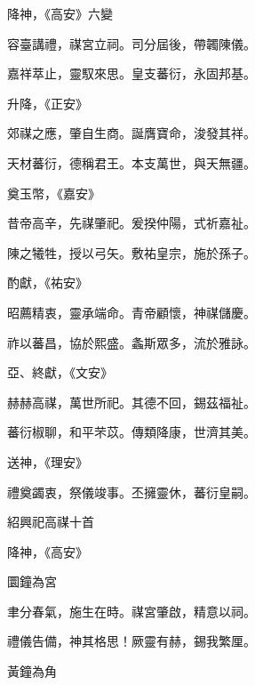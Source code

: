 \begin{pinyinscope}
 降神，《高安》六變



 容臺講禮，禖宮立祠。司分屆後，帶韣陳儀。



 嘉祥萃止，靈馭來思。皇支蕃衍，永固邦基。



 升降，《正安》



 郊禖之應，肇自生商。誕膺寶命，浚發其祥。



 天材蕃衍，德稱君王。本支萬世，與天無疆。



 奠玉幣，《嘉安》



 昔帝高辛，先禖肇祀。爰揆仲陽，式祈嘉祉。



 陳之犧牲，授以弓矢。敷祐皇宗，施於孫子。



 酌獻，《祐安》



 昭薦精衷，靈承端命。青帝顧懷，神禖儲慶。



 祚以蕃昌，協於熙盛。螽斯眾多，流於雅詠。



 亞、終獻，《文安》



 赫赫高禖，萬世所祀。其德不回，錫茲福祉。



 蕃衍椒聊，和平芣苡。傳類降康，世濟其美。



 送神，《理安》



 禮奠蠲衷，祭儀竣事。丕擁靈休，蕃衍皇嗣。



 紹興祀高禖十首



 降神，《高安》



 圜鐘為宮



 聿分春氣，施生在時。禖宮肇啟，精意以祠。



 禮儀告備，神其格思！厥靈有赫，錫我繁厘。



 黃鐘為角




\end{pinyinscope}
